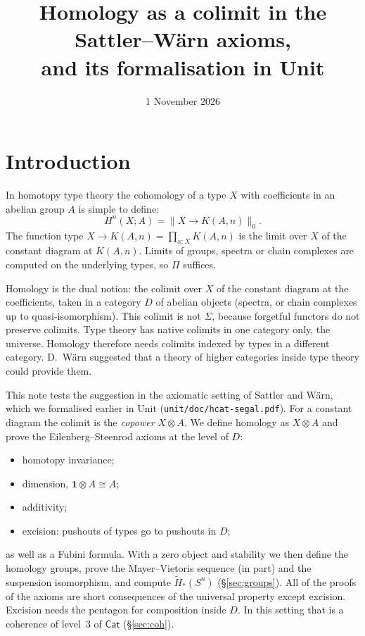 \documentclass[11pt]{amsart}
\title[Homology as a colimit]{Homology as a colimit in the Sattler--W\"arn
axioms,\\ and its formalisation in Unit}
\date{1 November 2026}
\numberwithin{equation}{section}
\theoremstyle{definition}
\theoremstyle{remark}
\newcommand{\code}[1]{\texttt{#1}}
\newcommand{\Cat}{\mathsf{Cat}}
\newcommand{\one}{\mathbf{1}}
\begin{document}
\sloppy
\maketitle

\section{Introduction}

In homotopy type theory the cohomology of a type $X$ with coefficients in an
abelian group $A$ is simple to define:
\[ H^n(X;A) = \| X \to K(A,n) \|_0 . \]
The function type $X \to K(A,n) = \prod_{x:X} K(A,n)$ is the limit over $X$ of
the constant diagram at $K(A,n)$. Limits of groups, spectra or chain complexes
are computed on the underlying types, so $\Pi$ suffices.

Homology is the dual notion: the colimit over $X$ of the constant diagram at
the coefficients, taken in a category $D$ of abelian objects (spectra, or chain
complexes up to quasi-isomorphism). This colimit is not $\Sigma$, because
forgetful functors do not preserve colimits. Type theory has native colimits
in one category only, the universe. Homology therefore needs colimits indexed
by types in a different category. D.~W\"arn suggested that a theory of higher
categories inside type theory could provide them.

This note tests the suggestion in the axiomatic setting of Sattler and W\"arn,
which we formalised earlier in Unit (\code{unit/doc/hcat-segal.pdf}). For a
constant diagram the colimit is the \emph{copower} $X\otimes A$. We define
homology as $X\otimes A$ and prove the Eilenberg--Steenrod axioms at the level
of $D$:
\begin{itemize}
\item homotopy invariance;
\item dimension, $\one\otimes A\cong A$;
\item additivity;
\item excision: pushouts of types go to pushouts in $D$;
\end{itemize}
as well as a Fubini formula. With a zero object and stability we then define
the homology groups, prove the Mayer--Vietoris sequence (in part) and the
suspension isomorphism, and compute $\tilde H_*(S^n)$ (\S\ref{sec:groups}).
All of the proofs of the axioms are short consequences of the
universal property except excision. Excision needs the pentagon for
composition inside $D$. In this setting that is a coherence of level~3 of
$\Cat$ (\S\ref{sec:coh}).
\end{document}
